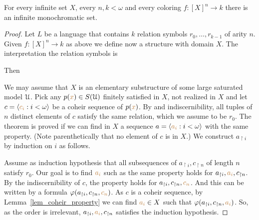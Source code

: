 \documentclass[creche.tex]{subfiles}
\begin{document}
\begin{proposition}
For every infinite set $X$, every $n,k<\omega$ and every coloring $f:[X]^n\to k$ there is an infinite monochromatic set.
\end{proposition}

\begin{proof}
Let $L$ be a language that contains $k$ relation symbols $r_0,\dots,r_{k-1}$ of arity $n$. Given $f:[X]^n\to k$ as above we define now a structure with domain $X$. The interpretation the relation symbols is




Then



We may assume that $X$ is an elementary substructure of some large saturated model $\EuScript U$. Pick any $p({\color{brown} x})\in S(\EuScript U)$ finitely satisfied in $X$, not realized in $X$ and let $c=\langle{\color{brown}c_i}:i<\omega\rangle$ be a coheir sequence of $p({\color{brown} x})$. By \ssf{\#} and indiscernibility, all tuples of $n$ distinct elements of $c$ satisfy the same relation, which we assume to be $r_0$. The theorem is proved if we can find in $X$ a sequence $a=\langle{\color{brown}a_i}:i<\omega\rangle$ with the same property. (Note parenthetically that no element of $c$ is in $X$.) We construct $a_{\restriction i}$ by induction on $i$ as follows. 

Assume as induction hypothesis that all subsequences of $a_{\restriction i},c_{\restriction n}$ of length $n$  
satisfy $r_0$. Our goal is to find ${\color{brown}{a_i}}$ such as the same property holds for $a_{\restriction i},{\color{brown}{a_i}},c_{\restriction n}$. By the indiscernibility of $c$, the property holds for  $a_{\restriction i},c_{\restriction n},{\color{brown}{c_n}}$.  And this can be written by a formula $\varphi(a_{\restriction i},c_{\restriction n},{\color{brown}{c_n}})$. As $c$ is a coheir sequence, by Lemma~\ref{lem_coheir_property} we can find  ${\color{brown}{a_i}}\in X$ such that  $\varphi(a_{\restriction i},c_{\restriction n},{\color{brown}{a_i}})$. So, as the order is irrelevant,  $a_{\restriction i},{\color{brown}{a_i}},c_{\restriction n}$ satisfies the induction hypothesis.
\end{proof}
\end{document}
